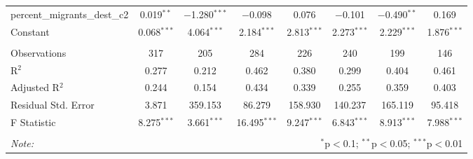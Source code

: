 \begin{table}[!htbp]
\begin{tabular}{@{\extracolsep{5pt}}lccccccc}
  percent\_migrants\_dest\_c2 & 0.019$^{**}$ & $-$1.280$^{***}$ & $-$0.098 & 0.076 & $-$0.101 & $-$0.490$^{**}$ & 0.169 \\ 
  Constant & 0.068$^{***}$ & 4.064$^{***}$ & 2.184$^{***}$ & 2.813$^{***}$ & 2.273$^{***}$ & 2.229$^{***}$ & 1.876$^{***}$ \\ 
 \hline \\[-1.8ex] 
Observations & 317 & 205 & 284 & 226 & 240 & 199 & 146 \\ 
R$^{2}$ & 0.277 & 0.212 & 0.462 & 0.380 & 0.299 & 0.404 & 0.461 \\ 
Adjusted R$^{2}$ & 0.244 & 0.154 & 0.434 & 0.339 & 0.255 & 0.359 & 0.403 \\ 
Residual Std. Error & 3.871 & 359.153 & 86.279 & 158.930 & 140.237 & 165.119 & 95.418 \\ 
F Statistic & 8.275$^{***}$ & 3.661$^{***}$ & 16.495$^{***}$ & 9.247$^{***}$ & 6.843$^{***}$ & 8.913$^{***}$ & 7.988$^{***}$ \\ 
\hline 
\hline \\[-1.8ex] 
\textit{Note:}  & \multicolumn{7}{r}{$^{*}$p$<$0.1; $^{**}$p$<$0.05; $^{***}$p$<$0.01} \\ 
\end{tabular} 
\end{table} 
